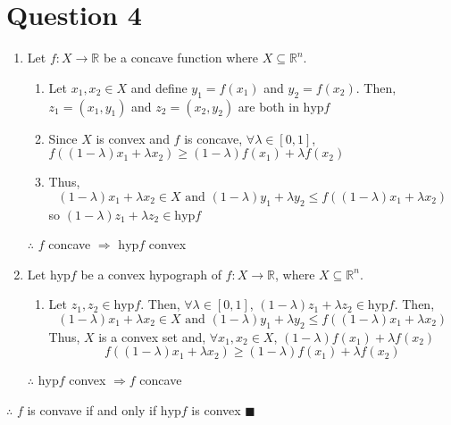 \documentclass{article}
\newcommand{\R}{\mathbb{R}}
\newcommand{\hyp}[1]{\text{hyp}#1}
\begin{document}
\section*{Question 4}
\begin{enumerate}
	\item Let $f:X\rightarrow\R$ be a concave function where $X\subseteq\R^n$.
		\begin{enumerate}
			\item Let $x_1,x_2\in X$ and define $y_1=f(x_1)$ and $y_2=f(x_2)$. Then, ${z_1=(x_1,y_1)}$ and ${z_2=(x_2,y_2)}$ are both in $\hyp{f}$
			\item Since $X$ is convex and $f$ is concave, $\forall\lambda\in[0,1]$, ${f((1-\lambda)x_1+\lambda x_2)\geq (1-\lambda)f(x_1) + \lambda f(x_2)}$
			\item Thus, 
				\[
					(1-\lambda)x_1 + \lambda x_2\in X\text{ and } (1-\lambda)y_1 + \lambda y_2\leq f((1-\lambda)x_1+\lambda x_2)
				\]
				so $(1-\lambda)z_1 + \lambda z_2\in\hyp{f}$
		\end{enumerate}
		$\therefore$ $f$ concave $\Rightarrow$ $\hyp{f}$ convex
	
	\item Let $\hyp{f}$ be a convex hypograph of $f:X\rightarrow\R$, where $X\subseteq\R^n$.
		\begin{enumerate}
			\item Let $z_1,z_2\in\hyp{f}$. Then, $\forall\lambda\in[0,1]$, ${(1-\lambda)z_1 + \lambda z_2\in\hyp{f}}$. Then,
				\[
					(1-\lambda)x_1 + \lambda x_2 \in X\text{ and } (1-\lambda)y_1 + \lambda y_2\leq f((1-\lambda)x_1 + \lambda x_2)
				\]
				Thus, $X$ is a convex set and, $\forall x_1,x_2\in X$, $(1-\lambda)f(x_1) + \lambda f(x_2)$
				\[
					f((1-\lambda)x_1+\lambda x_2)\geq (1-\lambda)f(x_1) + \lambda f(x_2)
				\]
		\end{enumerate}
		$\therefore$ $\hyp{f}$ convex $\Rightarrow f$ concave
		
\end{enumerate}
$\therefore$ $f$ is convave if and only if $\hyp{f}$ is convex $\blacksquare$


\end{document}
